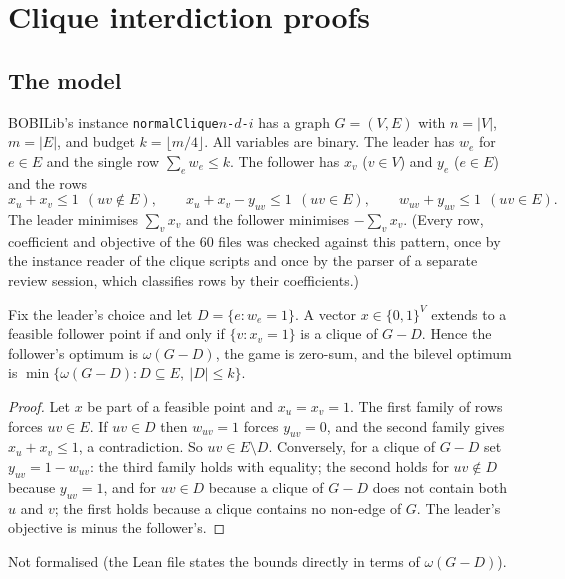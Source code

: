 \section{Clique interdiction proofs}\label{app:clique}

\subsection{The model}

BOBILib's instance \texttt{normalClique$n$-$d$-$i$} has a graph $G=(V,E)$ with
$n=|V|$, $m=|E|$, and budget $k=\lfloor m/4\rfloor$. All variables are binary.
The leader has $w_e$ for $e\in E$ and the single row $\sum_ew_e\le k$. The
follower has $x_v$ ($v\in V$) and $y_e$ ($e\in E$) and the rows
\[
  x_u+x_v\le 1\ \ (uv\notin E),\qquad
  x_u+x_v-y_{uv}\le 1\ \ (uv\in E),\qquad
  w_{uv}+y_{uv}\le 1\ \ (uv\in E).
\]
The leader minimises $\sum_vx_v$ and the follower minimises $-\sum_vx_v$. (Every row,
coefficient and objective of the 60 files was checked against this pattern,
once by the instance reader of the clique scripts and once by the parser of a
separate review session, which classifies rows by their coefficients.)

\begin{lemma}\label{lem:clique-model}
Fix the leader's choice and let $D=\{e: w_e=1\}$. A vector $x\in\{0,1\}^V$
extends to a feasible follower point if and only if $\{v: x_v=1\}$ is a clique
of $G-D$. Hence the follower's optimum is $\omega(G-D)$, the game is zero-sum,
and the bilevel optimum is $\min\{\omega(G-D): D\subseteq E,\ |D|\le k\}$.
\end{lemma}
\begin{proof}
Let $x$ be part of a feasible point and $x_u=x_v=1$. The first family of rows
forces $uv\in E$. If $uv\in D$ then $w_{uv}=1$ forces $y_{uv}=0$, and the
second family gives $x_u+x_v\le 1$, a contradiction. So $uv\in E\setminus D$.
Conversely, for a clique of $G-D$ set $y_{uv}=1-w_{uv}$: the third family holds
with equality; the second holds for $uv\notin D$ because $y_{uv}=1$, and for
$uv\in D$ because a clique of $G-D$ does not contain both $u$ and $v$; the
first holds because a clique contains no non-edge of $G$. The leader's
objective is minus the follower's.
\end{proof}
\noindent Not formalised (the Lean file states the bounds directly in terms of
$\omega(G-D)$).

